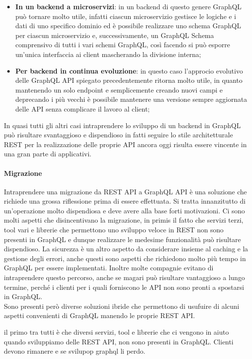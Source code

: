 \begin{itemize}
  \item \textbf{In un backend a microservizi}: in un backend di questo genere GraphQL può tornare molto utile, infatti ciascun microservizio gestisce le logiche e i dati di uno specifico dominio ed è possibile realizzare uno schema GraphQL per ciascun microservizio e, successivamente, un GraphQL Schema comprensivo di tutti i vari schemi GraphQL, così facendo si può esporre un'unica interfaccia ai client mascherando la divisione interna;
  \item \textbf{Per backend in continua evoluzione}: in questo caso l'approcio evolutivo delle GraphQL API spiegato precedentemente ritorna molto utile, in quanto mantenendo un solo endpoint e semplicemente creando nuovi campi e deprecando i più vecchi è possibile mantenere una versione sempre aggiornata delle API senza complicare il lavoro al client;
\end{itemize}
In quasi tutti gli altri casi intraprendere lo sviluppo di un backend in GraphQL può risultare svantaggioso e dispendioso in fatti seguire lo stile architetturale REST per la realizzazione delle proprie API ancora oggi risulta essere vincente in una gran parte di applicativi.
\paragraph{Migrazione}
Intraprendere una migrazione da REST API a GraphQL API è una soluzione che richiede una grossa riflessione prima di essere effettuata. Si tratta innanzitutto di un'operazione molto dispendiosa e deve avere alla base forti motivazioni. Ci sono molti aspetti che disincentivano la migrazione, in primis il fatto che servizi terzi, tool vari e librerie che permettono uno sviluppo veloce in REST non sono presenti in GraphQL e dunque realizzare le medesime funzionalità può risultare dispendioso. La sicurezza è un altro aspetto da considerare insieme al caching e la gestione degli errori, anche questi sono aspetti che richiedono molto più tempo in GraphQL per essere implementati. Inoltre molte compagnie evitano di intraprendere questo percorso, anche se magari può risultare vantaggioso a lungo termine, perché i clienti per i quali forniscono le API non sono pronti a spostarsi in GraphQL.\\
Sono presenti però diverse soluzioni ibride che permettono di usufuire di alcuni aspetti convenienti di GraphQL manendo le proprie REST API. 



 il primo tra tutti è che diversi servizi, tool e librerie che ci vengono in aiuto quando sviluppiamo delle REST API, non sono presenti in GraphQL.
Clienti devono rimanere e se svilupop graphql li perdo.

